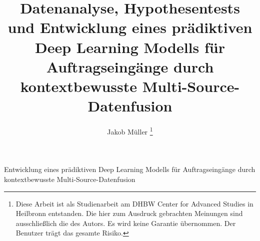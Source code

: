 \documentclass[lettersize,journal]{IEEEtran}
\begin{document}







\title{Datenanalyse, Hypothesentests und Entwicklung eines prädiktiven Deep Learning Modells für Auftragseingänge durch kontextbewusste Multi-Source-Datenfusion}

\author{Jakob Müller
\thanks{Diese Arbeit ist als Studienarbeit am DHBW Center for Advanced Studies in Heilbronn entstanden. Die hier zum Ausdruck gebrachten Meinungen sind ausschließlich die des Autors. Es wird keine Garantie übernommen. Der Benutzer trägt das gesamte Risiko.
  }}
%
{Entwicklung eines prädiktiven Deep Learning Modells für Auftragseingänge durch kontextbewusste Multi-Source-Datenfusion}
\end{document}
